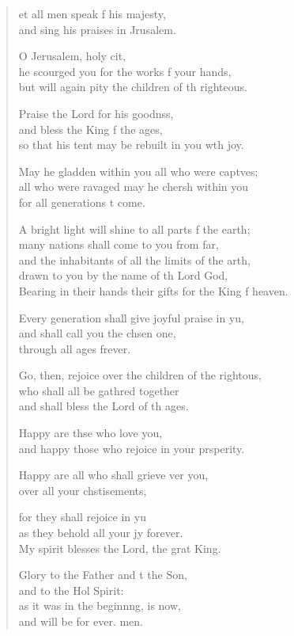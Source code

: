 \begin{verse}
  \begin{patverse}
et all men speak f his majesty,\Med\\
and sing his praises in Jrusalem.

O Jerusalem, holy cit,\Flex\\
he scourged you for the works f your hands,\Med\\
but will again pity the children of th righteous.

Praise the Lord for his goodnss,\Flex\\
and bless the King f the ages,\Med\\
so that his tent may be rebuilt in you w\pointup{\i}th joy.

May he gladden within you all who were capt\pointup{\i}ves;\Flex\\
all who were ravaged may he cher\pointup{\i}sh within you\Med\\
for all generations t come.

A bright light will shine to all parts f the earth;\Med\\
many nations shall come to you from far,\\
and the inhabitants of all the limits of the arth,\Flex\\
drawn to you by the name of th Lord God,\Med\\
Bearing in their hands their gifts for the King f heaven.

Every generation shall give joyful praise in yu,\Flex\\
and shall call you the chsen one,\Med\\
through all ages frever.

Go, then, rejoice over the children of the rightous,\Flex\\
who shall all be gathred together\Med\\
and shall bless the Lord of th ages.

Happy are thse who love you,\Med\\
and happy those who rejoice in your prsperity.

Happy are all who shall grieve ver you,\Med\\
over all your chstisements,

for they shall rejoice in yu\Flex\\
as they behold all your jy forever.\Med\\
My spirit blesses the Lord, the grat King.

Glory to the Father and t the Son,\Med\\
and to the Hol Spirit:\\
as it was in the beginn\pointup{\i}ng, is now,\Med\\
and will be for ever. men.

  \end{patverse}
\end{verse}
